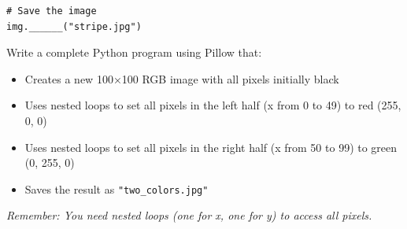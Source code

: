 \documentclass{csexam}
\begin{document}
\begin{questions}
\begin{lstlisting}
# Save the image
img.______("stripe.jpg")
\end{lstlisting}

\vspace{2cm}

\question[12] Write a complete Python program using Pillow that:
\begin{itemize}
    \item Creates a new 100×100 RGB image with all pixels initially black
    \item Uses nested loops to set all pixels in the left half (x from 0 to 49) to red (255, 0, 0)
    \item Uses nested loops to set all pixels in the right half (x from 50 to 99) to green (0, 255, 0)
    \item Saves the result as \texttt{"two\_colors.jpg"}
\end{itemize}

\textit{Remember: You need nested loops (one for x, one for y) to access all pixels.}

\vspace{10cm}

\end{questions}
\end{document}
